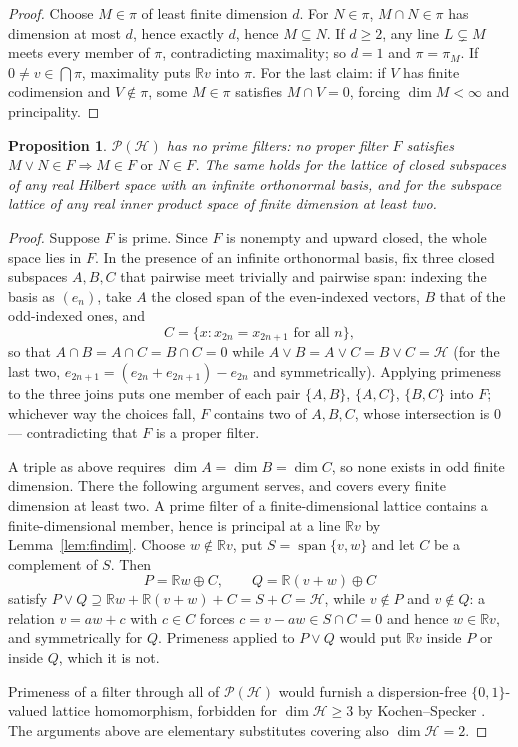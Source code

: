 \documentclass[11pt,reqno]{amsart}
\newtheorem{proposition}[theorem]{Proposition}
\theoremstyle{definition}
\newcommand{\HH}{\mathcal{H}}
\newcommand{\PP}{\mathcal{P}}
\newcommand{\R}{\mathbb{R}}
\newcommand{\pluf}{\pi}
\begin{document}
\begin{proof}
Choose $M\in\pluf$ of least finite dimension $d$. For $N\in\pluf$, $M\cap N\in\pluf$ has
dimension at most $d$, hence exactly $d$, hence $M\subseteq N$. If $d\geq2$, any line
$L\subsetneq M$ meets every member of $\pluf$, contradicting maximality; so $d=1$ and
$\pluf=\pluf_M$. If $0\neq v\in\bigcap\pluf$, maximality puts $\R v$ into $\pluf$. For the
last claim: if $V$ has finite codimension and $V\notin\pluf$, some $M\in\pluf$ satisfies
$M\cap V=0$, forcing $\dim M<\infty$ and principality.
\end{proof}

\begin{proposition}\label{prop:noprime}
$\PP(\HH)$ has no prime filters: no proper filter $F$ satisfies
$M\vee N\in F\Rightarrow M\in F\text{ or }N\in F$. The same holds for the lattice of
closed subspaces of any real Hilbert space with an infinite orthonormal basis, and for
the subspace lattice of any real inner product space of finite dimension at least two.
\end{proposition}

\begin{proof}
Suppose $F$ is prime. Since $F$ is nonempty and upward closed, the whole space lies in
$F$. In the presence of an infinite orthonormal basis, fix three closed subspaces
$A,B,C$ that pairwise meet trivially and pairwise span: indexing the basis as $(e_n)$,
take $A$ the closed span of the even-indexed vectors, $B$ that of the odd-indexed ones,
and
\[
C=\{x:x_{2n}=x_{2n+1}\text{ for all }n\},
\]
so that $A\cap B=A\cap C=B\cap C=0$ while $A\vee B=A\vee C=B\vee C=\HH$ (for the last two,
$e_{2n+1}=(e_{2n}+e_{2n+1})-e_{2n}$ and symmetrically). Applying primeness to the three
joins puts one member of each pair $\{A,B\}$, $\{A,C\}$, $\{B,C\}$ into $F$; whichever way
the choices fall, $F$ contains two of $A,B,C$, whose intersection is $0$ --- contradicting
that $F$ is a proper filter.

A triple as above requires $\dim A=\dim B=\dim C$, so none exists in odd finite
dimension. There the following argument serves, and covers every finite dimension at
least two. A prime filter of a finite-dimensional lattice contains a finite-dimensional
member, hence is principal at a line $\R v$ by Lemma~\ref{lem:findim}. Choose
$w\notin\R v$, put $S=\operatorname{span}\{v,w\}$ and let $C$ be a complement of $S$.
Then
\[
P=\R w\oplus C,\qquad Q=\R(v+w)\oplus C
\]
satisfy $P\vee Q\supseteq\R w+\R(v+w)+C=S+C=\HH$, while $v\notin P$ and $v\notin Q$: a
relation $v=aw+c$ with $c\in C$ forces $c=v-aw\in S\cap C=0$ and hence $w\in\R v$, and
symmetrically for $Q$. Primeness applied to $P\vee Q$ would put $\R v$ inside $P$ or
inside $Q$, which it is not.

Primeness of a filter through all of $\PP(\HH)$ would furnish a dispersion-free
$\{0,1\}$-valued lattice homomorphism, forbidden for $\dim\HH\geq3$ by Kochen--Specker
\cite{KS}. The arguments above are elementary substitutes covering also $\dim\HH=2$.
\end{proof}
\end{document}
